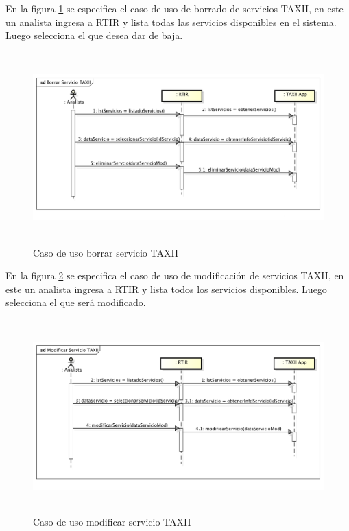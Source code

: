 \bigskip

	En la figura \ref{fig.borradoserviciotaxii} se especifica el caso de uso de borrado de servicios TAXII, en este un analista ingresa a RTIR y lista
	todas las servicios disponibles en el sistema. Luego selecciona el que desea dar de baja.
\begin{figure}[H]
	\centering
	\includegraphics[width=5.7634in,height=2.898in]{Analisis22-img/Analisis22-img024.png} 
	\caption{Caso de uso borrar	servicio TAXII}
	\label{fig.borradoserviciotaxii}
\end{figure}

En la figura \ref{fig.modificarserviciotaxii} se especifica el caso de uso de modificación de servicios TAXII, en este un analista ingresa a RTIR y
lista todos los servicios disponibles. Luego selecciona el que será modificado.

\begin{figure}[H]
	\centering
	\includegraphics[width=5.7638in,height=2.9366in]{Analisis22-img/Analisis22-img025.png} 
	\caption{Caso de uso modificar servicio TAXII}
	\label{fig.modificarserviciotaxii}
\end{figure}

